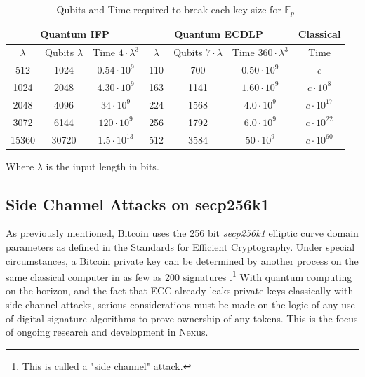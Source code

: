 \documentclass[11pt]{article}
\begin{document}
\begin{table}[ht]
\caption{Qubits and Time required to break each key size for $\mathbb{F}_{p}$ \cite{quantumattacks}}
\begin{center}
\begin{tabular}{|c|c|c||c|c|c||c|}
    \hline
    \multicolumn{3}{|c||}{Quantum IFP} &
    \multicolumn{3}{c||}{Quantum ECDLP} &
    Classical \\
    \hline
    $\lambda$ & Qubits $\lambda$ & Time $4 \cdot \lambda ^ 3$ & $\lambda$ & Qubits $7 \cdot \lambda$ & Time $360 \cdot \lambda ^ 3$ & Time \\
    \hline
    \hline
    512 & 1024 & $0.54 \cdot 10^9$ & 
    110 & 700  & $0.50 \cdot 10^9$ & $c$ \\
    
    1024 & 2048 & $4.30 \cdot 10^9$ & 
    163  & 1141 & $1.60 \cdot 10^9$ & $c \cdot 10^8$ \\
    
    2048 & 4096 & $34 \cdot 10^9$ & 
    224  & 1568 & $4.0 \cdot 10^9$ & $c \cdot 10^{17}$ \\
    
    3072 & 6144 & $120 \cdot 10^9$ & 
    256 & 1792  & $6.0 \cdot 10^9$ & $c \cdot 10^{22}$ \\
    
    15360 & 30720 & $1.5 \cdot 10^{13}$ & 
    512   & 3584  & $50 \cdot 10^9$ & $c \cdot 10^{60}$ \\
    \hline
\end{tabular}
Where $\lambda$ is the input length in bits.
\end{center}
\end{table}

\subsection{Side Channel Attacks on secp256k1}

As previously mentioned, Bitcoin uses the 256 bit \textit{secp256k1} elliptic curve domain parameters as defined in the Standards for Efficient Cryptography.
Under special circumstances, a Bitcoin private key can be determined by another process on the same classical computer in as few as 200 signatures \cite{sigleak}.\footnote{This is called a "side channel" attack.}
With quantum computing on the horizon, and the fact that ECC already leaks private keys classically with side channel attacks, serious considerations must be made on the logic of any use of digital signature algorithms to prove ownership of any tokens.
This is the focus of ongoing research and development in Nexus.
\end{document}
